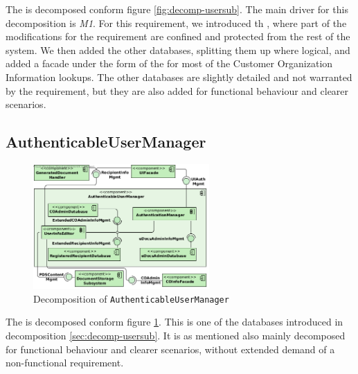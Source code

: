 The  is decomposed conform figure \ref{fig:decomp-usersub}. The main driver for this decomposition is \emph{M1}. For this requirement, we introduced th , where part of the modifications for the requirement are confined and protected from the rest of the system. We then added the other databases, splitting them up where logical, and added a facade under the form of the  for most of the Customer Organization Information lookups. The other databases are slightly detailed and not warranted by the requirement, but they are also added for functional behaviour and clearer scenarios.

\subsection{AuthenticableUserManager}
\begin{figure}[!htp]
    \centering
    \includegraphics[width=0.6\textwidth]{figures/AuthenticableUserManager.png}
    \caption{Decomposition of \texttt{AuthenticableUserManager}}\label{fig:decomp-authuserman}
\end{figure}

The  is decomposed conform figure \ref{fig:decomp-authuserman}. This is one of the databases introduced in decomposition \ref{sec:decomp-usersub}. It is as mentioned also mainly decomposed for functional behaviour and clearer scenarios, without extended demand of a non-functional requirement.

